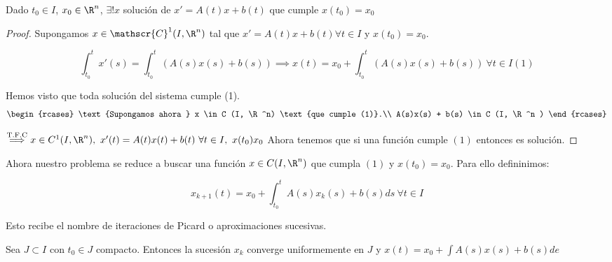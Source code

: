 \begin{nth}

  Dado $t_0 \in I$, $x_0 \in \R ^n $, $\exists ! x $ solución de $x' = A(t)x+b(t)$ que cumple $x(t_0) = x_0 $

\end{nth}

\begin{proof}

  Supongamos $x \in \mathscr{C}^1 (I, \R ^n) $ tal que $x' = A(t) x + b(t) \forall t \in I$ y $x(t_0) = x_0$.

 \begin{equation}
   \int _{t_0} ^t x'(s) = \int _{t_0} ^t (A(s)x(s) + b(s)) \implies x(t) = x_0 + \int _{t_0} ^t (A(s)x(s) + b(s)) \ \forall t \in I (1)
 \end{equation}

  Hemos visto que toda solución del sistema cumple (1).
\[
  \begin{rcases}
    \text{Supongamos ahora } x \in C (I, \R ^n) \text{que cumple (1)}.\\
    A(s)x(s) + b(s) \in C (I, \R ^n )
  \end{rcases}
\]
  	
  $\overset{\text{T.F.C}}{\implies} x \in C ^1 (I, \R^n), \ x'(t) = A(t)x(t) + b(t) \ \forall t \in I, \ x(t_0 ) x_0 $
  Ahora tenemos que si una función cumple $(1)$ entonces es solución.


\end{proof}

Ahora nuestro problema se reduce a buscar una función $x \in C (I , \R ^n)$ que cumpla $(1)$ y $x(t_0) = x_0 $.
Para ello defininimos:

\[
x_{k+1} (t) = x_0 + \int _{t_0} ^t A(s)x_k (s) + b(s) ds \ \forall t \in I
\]

Esto recibe el nombre de iteraciones de Picard o aproximaciones sucesivas.

Sea $J \subset I$ con $t_0 \in J$ compacto. Entonces la sucesión ${x_k}$ converge uniformemente en $J$ y $x(t) = x_0 + \int A(s)x(s) + b(s) de $

